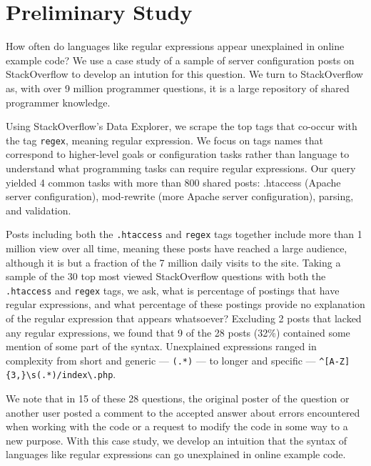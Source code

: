 \section{Preliminary Study}

How often do languages like regular expressions appear unexplained in online example code?
We use a case study of a sample of server configuration posts on StackOverflow to develop an intution for this question.
We turn to StackOverflow as, with over 9 million programmer questions, it is a large repository of shared programmer knowledge.

Using StackOverflow's Data Explorer, we scrape the top tags that co-occur with the tag \texttt{regex}, meaning regular expression.
We focus on tags names that correspond to higher-level goals or configuration tasks rather than language to understand what programming tasks can require regular expressions.
Our query yielded  4 common tasks with more than 800 shared posts: .htaccess (Apache server configuration), mod-rewrite (more Apache server configuration), parsing, and validation.

Posts including both the \texttt{.htaccess} and \texttt{regex} tags together include more than 1 million view over all time, meaning these posts have reached a large audience, although it is but a fraction of the 7 million daily visits to the site.
Taking a sample of the 30 top most viewed StackOverflow questions with both the \texttt{.htaccess} and \texttt{regex} tags, we ask, what is percentage of postings that have regular expressions, and what percentage of these postings provide no explanation of the regular expression that appears whatsoever?
Excluding 2 posts that lacked any regular expressions, we found that 9 of the 28 posts (32\%) contained some mention of some part of the syntax.
Unexplained expressions ranged in complexity from short and generic --- \texttt{(.*)} --- to longer and specific --- \texttt{\^{}[A-Z]\{3,\}\textbackslash{}s(.*)/index\textbackslash{}.php}. 

We note that in 15 of these 28 questions, the original poster of the question or another user posted a comment to the accepted answer about errors encountered when working with the code or a request to modify the code in some way to a new purpose.
With this case study, we develop an intuition that the syntax of languages like regular expressions can go unexplained in online example code.
